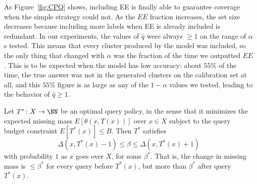 \documentclass{scrartcl}
\begin{document}
As Figure~\ref{fig:CPQ} shows, including EE is finally able to guarantee coverage when the simple strategy could not. As the $EE$ fraction increases, the set size decreases because including more labels when EE is already included is redundant.
In our experiments, the values of $\hat{q}$ were always $\ge 1$ on the range of $\alpha$s tested. 
This means that every cluster produced by the model was included, 
so the only thing that changed with $\alpha$ was the fraction of the time we outputted $EE$. 
This is to be expected when the model has low accuracy: about $55\%$ of the time, 
the true answer was not in the generated clusters on the calibration set at all, 
and this $55\%$ figure is as large as any of the $1 - \alpha$ values we tested, leading to the behavior of $\hat{q} \ge 1$. \medskip

\begin{claim*}
\label{querypolicy}
Let $T^* \colon X \to \NN$  be an optimal query policy, in the sense that it minimizes the expected missing mass $E[\theta(x, T(x))]$ over $x \in X$ subject to the query budget constraint $E[T^*(x)] \le B$. Then $T^*$ satisfies 
\begin{equation} \Delta(x, T^*(x) - 1) \le \beta \le \Delta(x, T^*(x) + 1) \label{idealquery} \end{equation}
with probability $1$ as $x$ goes over $X$, for some $\beta^*$.
That is, the change in missing mass is $\le \beta^*$ for every query before $T^*(x)$, but more than $\beta^*$ after query $T^*(x)$.
\end{claim*}
\end{document}
